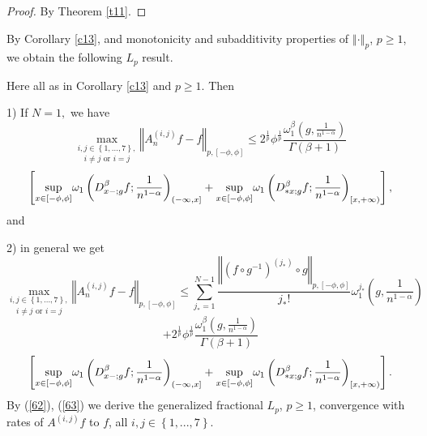\documentclass[10pt]{NSP1}
\numberwithin{equation}{section}
\begin{document}
\begin{proof}
By Theorem \ref{t11}.
\end{proof}

By Corollary \ref{c13}, and monotonicity and subadditivity properties of $%
\left \Vert \cdot \right \Vert _{p}$, $p\geq 1$, we obtain the following $%
L_{p} $ result.

\begin{corollary}
\label{c14} Here all as in Corollary \ref{c13} and $p\geq 1$. Then

1) If $N=1,$ we have
\begin{equation}
\underset{i\neq j\text{ or }i=j}{\underset{i,j\in \left \{ 1,...,7\right \} ,%
}{\max }}\left \Vert A_{n}^{\left( i,j\right) }f-f\right \Vert _{p,\left[
-\phi ,\phi \right] }\leq 2^{\frac{1}{p}}\phi ^{\frac{1}{p}}\frac{\omega
_{1}^{\beta }\left( g,\frac{1}{n^{1-\alpha }}\right) }{\Gamma \left( \beta
+1\right) }  \tag{62}  \label{62}
\end{equation}
\begin{equation*}
\left[ \underset{x\in \left[ -\phi ,\phi \right] }{\sup }\omega _{1}\left(
D_{x-;g}^{\beta }f;\frac{1}{n^{1-\alpha }}\right) _{(-\infty ,x]}+\underset{%
x\in \left[ -\phi ,\phi \right] }{\sup }\omega _{1}\left( D_{\ast
x;g}^{\beta }f;\frac{1}{n^{1-\alpha }}\right) _{[x,+\infty )}\right] ,
\end{equation*}
and

2) in general we get
\begin{equation}
\underset{i\neq j\text{ or }i=j}{\underset{i,j\in \left \{ 1,...,7\right \} ,%
}{\max }}\left \Vert A_{n}^{\left( i,j\right) }f-f\right \Vert _{p,\left[
-\phi ,\phi \right] }\leq \sum_{j_{\ast }=1}^{N-1}\frac{\left \Vert \left(
f\circ g^{-1}\right) ^{\left( j_{\ast }\right) }\circ g\right \Vert _{p,%
\left[ -\phi ,\phi \right] }}{j_{\ast }!}\omega _{1}^{j_{\ast }}\left( g,%
\frac{1}{n^{1-\alpha }}\right)  \tag{63}  \label{63}
\end{equation}
\begin{equation*}
+2^{\frac{1}{p}}\phi ^{\frac{1}{p}}\frac{\omega _{1}^{\beta }\left( g,\frac{1%
}{n^{1-\alpha }}\right) }{\Gamma \left( \beta +1\right) }
\end{equation*}
\begin{equation*}
\left[ \underset{x\in \left[ -\phi ,\phi \right] }{\sup }\omega _{1}\left(
D_{x-;g}^{\beta }f;\frac{1}{n^{1-\alpha }}\right) _{(-\infty ,x]}+\underset{%
x\in \left[ -\phi ,\phi \right] }{\sup }\omega _{1}\left( D_{\ast
x;g}^{\beta }f;\frac{1}{n^{1-\alpha }}\right) _{[x,+\infty )}\right] .
\end{equation*}
By (\ref{62}), (\ref{63}) we derive the generalized fractional $L_{p}$, $%
p\geq 1$, convergence with rates of $A^{\left( i,j\right) }f$ to $f$, all $%
i,j\in \left \{ 1,...,7\right \} .$
\end{corollary}
\end{document}
